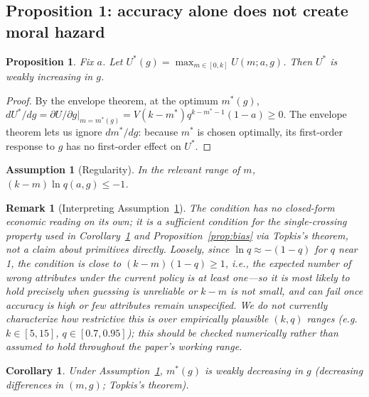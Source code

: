 \documentclass[11pt]{article}
\newtheorem{proposition}{Proposition}
\newtheorem{corollary}{Corollary}
\newtheorem{assumption}{Assumption}
\newtheorem{remark}{Remark}
\begin{document}
\subsection{Proposition 1: accuracy alone does not create moral hazard}

\begin{proposition}\label{prop:accuracy}
Fix $a$. Let $U^*(g) = \max_{m \in [0,k]} U(m;a,g)$. Then $U^*$ is weakly
increasing in $g$.
\end{proposition}

\begin{proof}
By the envelope theorem, at the optimum $m^*(g)$,
$dU^*/dg = \partial U/\partial g\big|_{m=m^*(g)} = V(k-m^*)q^{k-m^*-1}(1-a) \ge 0$.
The envelope theorem lets us ignore $dm^*/dg$: because $m^*$ is chosen optimally,
its first-order response to $g$ has no first-order effect on $U^*$.
\end{proof}

\begin{assumption}[Regularity]\label{ass:reg}
In the relevant range of $m$, $(k-m)\ln q(a,g) \le -1$.
\end{assumption}

\begin{remark}[Interpreting Assumption~\ref{ass:reg}]
The condition has no closed-form economic reading on its own; it is a sufficient
condition for the single-crossing property used in Corollary~\ref{cor:mono} and
Proposition~\ref{prop:bias} via Topkis's theorem, not a claim about primitives
directly. Loosely, since $\ln q \approx -(1-q)$ for $q$ near 1, the condition is
close to $(k-m)(1-q) \ge 1$, i.e., the expected number of \emph{wrong} attributes
under the current policy is at least one---so it is most likely to hold precisely
when guessing is unreliable or $k-m$ is not small, and can fail once accuracy is
high or few attributes remain unspecified. We do not currently characterize how
restrictive this is over empirically plausible $(k,q)$ ranges (e.g.\ $k\in[5,15]$,
$q\in[0.7,0.95]$); this should be checked numerically rather than assumed to hold
throughout the paper's working range.
\end{remark}

\begin{corollary}\label{cor:mono}
Under Assumption~\ref{ass:reg}, $m^*(g)$ is weakly decreasing in $g$ (decreasing
differences in $(m,g)$; Topkis's theorem).
\end{corollary}
\end{document}

